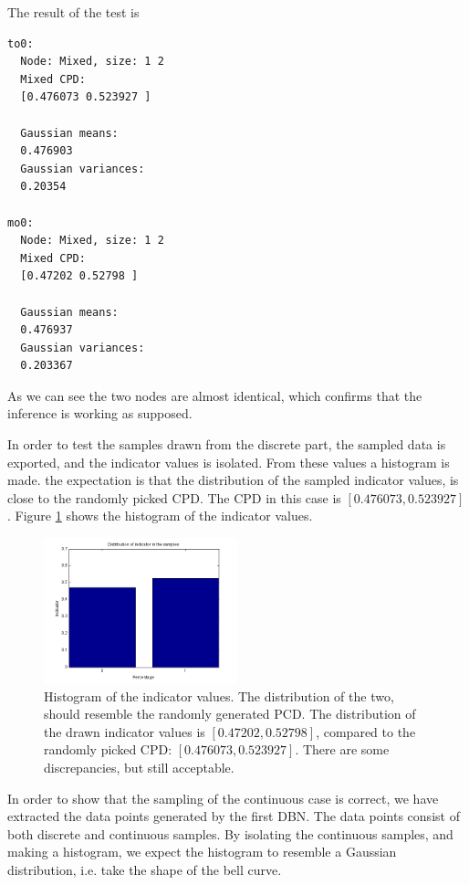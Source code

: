 \documentclass[10pt, journal, compsoc, a4paper]{IEEEtran}
\begin{document}
The result of the test is

\begin{verbatim}
to0:
  Node: Mixed, size: 1 2 
  Mixed CPD: 
  [0.476073 0.523927 ]

  Gaussian means: 
  0.476903 
  Gaussian variances: 
  0.20354 
    
mo0:
  Node: Mixed, size: 1 2 
  Mixed CPD: 
  [0.47202 0.52798 ]

  Gaussian means: 
  0.476937 
  Gaussian variances: 
  0.203367 
\end{verbatim}
As we can see the two nodes are almost identical, which confirms that the inference is working as supposed.

In order to test the samples drawn from the discrete part, the sampled data is exported, and the indicator values is isolated. From these values a histogram is made. the expectation is that the distribution of the sampled indicator values, is close to the randomly picked CPD. The CPD in this case is $[0.476073, 0.523927]$. Figure \ref{fig3} shows the histogram of the indicator values.

\begin{figure}[ht]
\centering
\includegraphics[width=0.5\textwidth]{figures/fig3.png}                                                                             
\caption{Histogram of the indicator values. The distribution of the two, should resemble the randomly generated PCD. The distribution of the drawn indicator values is $[0.47202,  0.52798]$, compared to the randomly picked CPD: $[0.476073, 0.523927]$. There are some discrepancies, but still acceptable.}
\label{fig3}
\end{figure}

In order to show that the sampling of the continuous case is correct, we have extracted the data points generated by the first DBN. The data points consist of both discrete and continuous samples. By isolating the continuous samples, and making a histogram, we expect the histogram to resemble a Gaussian distribution, i.e. take the shape of the bell curve. 
\end{document}
